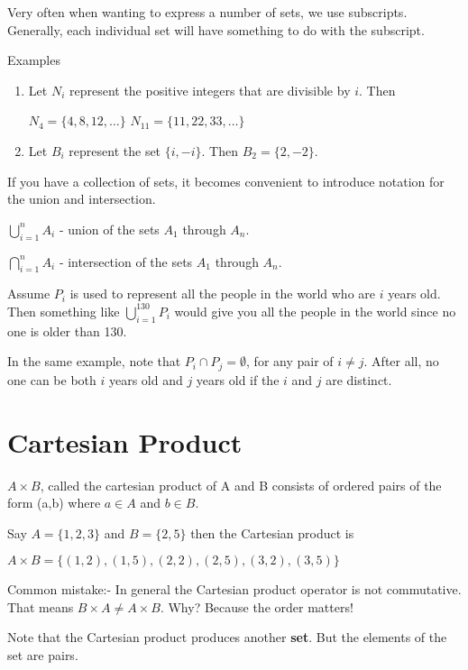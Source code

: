 \documentclass[12pt]{article}
\begin{document}
Very often when wanting to express a number of sets, we use subscripts. 
Generally, each individual set will have something to do with the subscript.

Examples

\begin{enumerate}
\item Let $N_i$ represent the positive integers that are divisible by $i$. Then

$N_4 = \{4,8,12,\ldots\}$
$N_{11} = \{11, 22, 33, \ldots\}$

\item Let $B_i$ represent the set $\{i,-i\}$. Then $B_2 = \{2,-2\}$.
\end{enumerate}

If you have a collection of sets, it becomes convenient to introduce notation for the union and intersection.

$\displaystyle \bigcup_{i=1}^n A_i$ - union of the sets $A_1$ through $A_n$.

$\displaystyle \bigcap_{i=1}^n A_i$ - intersection of the sets $A_1$ through $A_n$.

Assume $P_i$ is used to represent all the people in the world who are $i$ years old. 
Then something like $\displaystyle \bigcup_{i=1}^{130} P_i$ would give you all the people in the world since no one is older than 130. 

In the same example, note that $P_i \cap P_j = \emptyset$, for any pair of $i \neq j$. After all, no one can be both $i$ years old and $j$ years old if the $i$ and $j$ are distinct.

\section*{Cartesian Product}

$A \times B$, called the cartesian product of A and B consists of ordered pairs of the form (a,b) where $a \in A$ and $b \in B$.

Say $A = \{1,2,3\}$ and $B = \{2,5\}$ then the Cartesian product is

$A \times B = \{(1,2), (1,5), (2,2), (2,5), (3,2), (3,5)\}$ 

Common mistake:- In general the Cartesian product operator is not commutative. That means $B \times A \neq A \times B$. Why? Because the order matters!

Note that the Cartesian product produces another {\bf set}. But the elements of the set are pairs. 

\medskip
\end{document}
